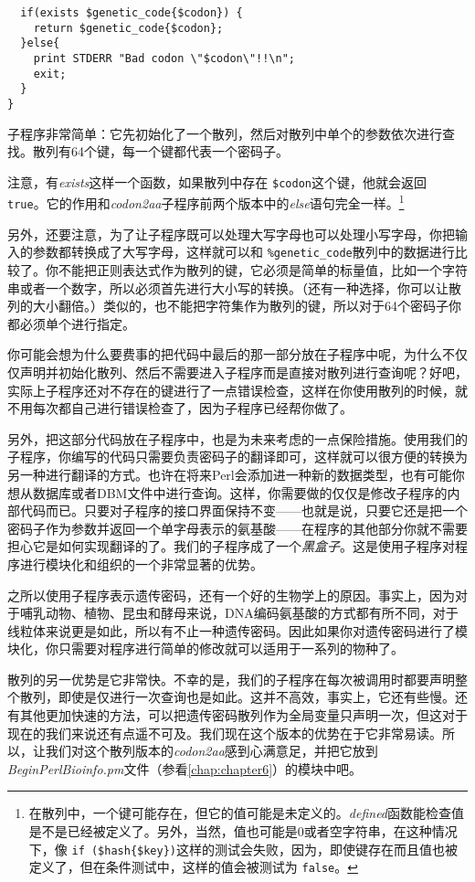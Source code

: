 \begin{lstlisting}
  if(exists $genetic_code{$codon}) {
    return $genetic_code{$codon};
  }else{
    print STDERR "Bad codon \"$codon\"!!\n";
    exit;
  }
}
\end{lstlisting}

子程序非常简单：它先初始化了一个散列，然后对散列中单个的参数依次进行查找。散列有64个键，每一个键都代表一个密码子。

注意，有\textit{exists}这样一个函数，如果散列中存在 \verb|$codon|这个键，他就会返回 \verb|true|。它的作用和\textit{codon2aa}子程序前两个版本中的\textit{else}语句完全一样。\footnote{在散列中，一个键可能存在，但它的值可能是未定义的。\textit{defined}函数能检查值是不是已经被定义了。另外，当然，值也可能是0或者空字符串，在这种情况下，像 \verb|if ($hash{$key})|这样的测试会失败，因为，即使键存在而且值也被定义了，但在条件测试中，这样的值会被测试为 \verb|false|。}

另外，还要注意，为了让子程序既可以处理大写字母也可以处理小写字母，你把输入的参数都转换成了大写字母，这样就可以和 \verb|%genetic_code|散列中的数据进行比较了。你不能把正则表达式作为散列的键，它必须是简单的标量值，比如一个字符串或者一个数字，所以必须首先进行大小写的转换。（还有一种选择，你可以让散列的大小翻倍。）类似的，也不能把字符集作为散列的键，所以对于64个密码子你都必须单个进行指定。

你可能会想为什么要费事的把代码中最后的那一部分放在子程序中呢，为什么不仅仅声明并初始化散列、然后不需要进入子程序而是直接对散列进行查询呢？好吧，实际上子程序还对不存在的键进行了一点错误检查，这样在你使用散列的时候，就不用每次都自己进行错误检查了，因为子程序已经帮你做了。

另外，把这部分代码放在子程序中，也是为未来考虑的一点保险措施。使用我们的子程序，你编写的代码只需要负责密码子的翻译即可，这样就可以很方便的转换为另一种进行翻译的方式。也许在将来Perl会添加进一种新的数据类型，也有可能你想从数据库或者DBM文件中进行查询。这样，你需要做的仅仅是修改子程序的内部代码而已。只要对子程序的接口界面保持不变——也就是说，只要它还是把一个密码子作为参数并返回一个单字母表示的氨基酸——在程序的其他部分你就不需要担心它是如何实现翻译的了。我们的子程序成了一个\textit{黑盒子}。这是使用子程序对程序进行模块化和组织的一个非常显著的优势。

之所以使用子程序表示遗传密码，还有一个好的生物学上的原因。事实上，因为对于哺乳动物、植物、昆虫和酵母来说，DNA编码氨基酸的方式都有所不同，对于线粒体来说更是如此，所以有不止一种遗传密码。因此如果你对遗传密码进行了模块化，你只需要对程序进行简单的修改就可以适用于一系列的物种了。

散列的另一优势是它非常快。不幸的是，我们的子程序在每次被调用时都要声明整个散列，即使是仅进行一次查询也是如此。这并不高效，事实上，它还有些慢。还有其他更加快速的方法，可以把遗传密码散列作为全局变量只声明一次，但这对于现在的我们来说还有点遥不可及。我们现在这个版本的优势在于它非常易读。所以，让我们对这个散列版本的\textit{codon2aa}感到心满意足，并把它放到\textit{BeginPerlBioinfo.pm}文件（参看\autoref{chap:chapter6}）的模块中吧。

